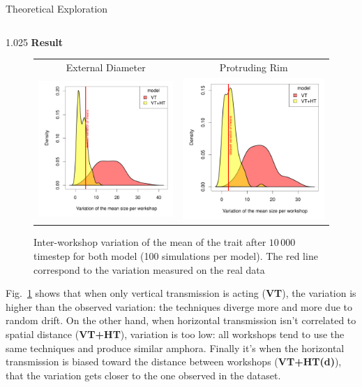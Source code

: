 \documentclass[final]{beamer}
\newlength{\onecolwid}
\newlength{\twocolwid}
\begin{document}
\begin{frame}[t]
\begin{columns}[t]
\begin{column}{\twocolwid}
\begin{block}{Theoretical Exploration}
\begin{columns}[t,totalwidth=\twocolwid]
\begin{column}{1.025\onecolwid} %
{\textbf{Result}}\\
\justify
\vspace{-1cm}
    \begin{figure}[h!]
	\begin{tabular}{cc}
	    \centering
	    \small   External Diameter & \small Protruding Rim\\
	    \includegraphics[width=0.5\linewidth]{images/ED_densities.pdf}&
	    \includegraphics[width=0.5\linewidth]{images/PR_densities.pdf}\\
	\end{tabular}
\singlespace
\vspace{-.8cm}
\caption{Inter-workshop variation of the mean of the trait after $10\,000$ timestep for both model (100 simulations per model). The red line correspond to the variation measured on the real data}
	\label{fig:resmod}
    \end{figure}
Fig.~\ref{fig:resmod} shows that when only vertical transmission is acting ({\footnotesize\textbf{VT}}), the variation is higher than the observed variation: the techniques diverge more and more due to random drift. On the other hand, when horizontal transmission isn't correlated to spatial distance ({\footnotesize\textbf{VT+HT}}), variation is too low: all workshops tend to use the same techniques and produce similar amphora. Finally it's when the horizontal transmission is biased toward the distance between workshops ({\footnotesize\textbf{VT+HT(d)}}), that the variation gets closer to the one observed in the dataset.
\end{column}
\end{columns}


\end{block}
\end{column}
\end{columns}
\end{frame}
\end{document}
